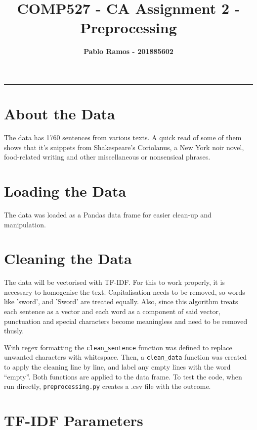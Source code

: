 \documentclass[11pt]{article}
\title{\textcolor{NavyBlue}{\textbf{COMP527 - CA Assignment 2 - Preprocessing}}}
\author{\textbf{Pablo Ramos - 201885602}}
\begin{document}
%
%
\maketitle
{\setlength\parindent{0mm} {\color{NavyBlue} \rule{\linewidth}{0.5mm}}} %
\section{About the Data}

The data has 1760 sentences from various texts. A quick read of some of them shows that it's snippets from Shakespeare's Coriolanus, a New York noir novel, food-related writing and other miscellaneous or nonsensical phrases.

\section{Loading the Data}

The data was loaded as a Pandas data frame for easier clean-up and manipulation. 

\section{Cleaning the Data}

The data will be vectorised with TF-IDF. For this to work properly, it is necessary to homogenise the text. Capitalisation needs to be removed, so words like 'sword', and 'Sword' are treated equally. Also, since this algorithm treats each sentence as a vector and each word as a component of said vector, punctuation and special characters become meaningless and need to be removed thusly.

With regex formatting the \texttt{clean\_sentence} function was defined to replace unwanted characters with whitespace. Then, a \texttt{clean\_data} function was created to apply the cleaning line by line, and label any empty lines with the word ``empty''. Both functions are applied to the data frame. To test the code, when run directly, \texttt{preprocessing.py} creates a .csv file with the outcome.

\section{TF-IDF Parameters}
\end{document}
